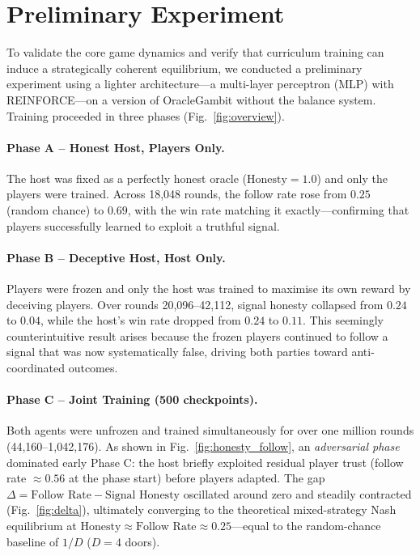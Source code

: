 \documentclass[11pt,a4paper]{article}
\begin{document}
\section{Preliminary Experiment}
\label{sec:prelim}

To validate the core game dynamics and verify that curriculum training can
induce a strategically coherent equilibrium, we conducted a preliminary
experiment using a lighter architecture---a multi-layer perceptron (MLP)
with REINFORCE---on a version of OracleGambit without the balance system.
Training proceeded in three phases (Fig.~\ref{fig:overview}).

\paragraph{Phase A -- Honest Host, Players Only.}
The host was fixed as a perfectly honest oracle ($\text{Honesty}=1.0$)
and only the players were trained.
Across 18{,}048 rounds, the follow rate rose from $0.25$ (random chance)
to $0.69$, with the win rate matching it exactly---confirming that players
successfully learned to exploit a truthful signal.

\paragraph{Phase B -- Deceptive Host, Host Only.}
Players were frozen and only the host was trained to maximise its own
reward by deceiving players.
Over rounds 20{,}096--42{,}112, signal honesty collapsed from $0.24$ to
$0.04$, while the host's win rate dropped from $0.24$ to $0.11$.
This seemingly counterintuitive result arises because the frozen players
continued to follow a signal that was now systematically false, driving
both parties toward anti-coordinated outcomes.

\paragraph{Phase C -- Joint Training (500 checkpoints).}
Both agents were unfrozen and trained simultaneously for over one million
rounds (44{,}160--1{,}042{,}176).
As shown in Fig.~\ref{fig:honesty_follow}, an \emph{adversarial phase}
dominated early Phase C: the host briefly exploited residual player trust
(follow rate $\approx 0.56$ at the phase start) before players adapted.
The gap $\Delta = \text{Follow Rate} - \text{Signal Honesty}$ oscillated
around zero and steadily contracted (Fig.~\ref{fig:delta}),
ultimately converging to the theoretical mixed-strategy Nash equilibrium
at $\text{Honesty} \approx \text{Follow Rate} \approx 0.25$---equal to
the random-chance baseline of $1/D$ ($D=4$ doors).
\end{document}
